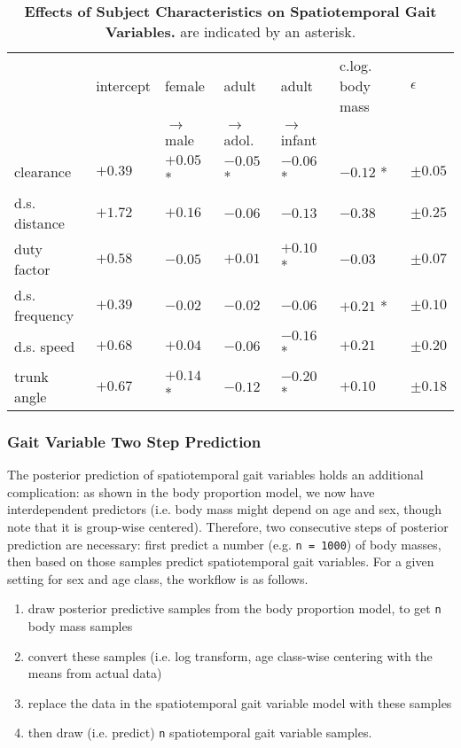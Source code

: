 \begin{table}[p]
\caption{\label{tab:strideresults}\textbf{Effects of Subject Characteristics on Spatiotemporal Gait Variables.}  are indicated by an asterisk.}
\centering
\begin{small}
\begin{tabular}{|l|l|l|l|l|l|l|}
\hline
 & intercept & female  & adult  & adult  & c.log. body mass & \(\epsilon\)\\[0pt]
 &  & \(\rightarrow\) male & \(\rightarrow\) adol. & \(\rightarrow\) infant &  & \\[0pt]
\hline
clearance & \(+0.39\) & \(+0.05\) * & \(-0.05\) * & \(-0.06\) * & \(-0.12\) * & \(\pm 0.05\)\\[0pt]
d.s. distance & \(+1.72\) & \(+0.16\) & \(-0.06\) & \(-0.13\) & \(-0.38\) & \(\pm 0.25\)\\[0pt]
duty factor & \(+0.58\) & \(-0.05\) & \(+0.01\) & \(+0.10\) * & \(-0.03\) & \(\pm 0.07\)\\[0pt]
d.s. frequency & \(+0.39\) & \(-0.02\) & \(-0.02\) & \(-0.06\) & \(+0.21\) * & \(\pm 0.10\)\\[0pt]
d.s. speed & \(+0.68\) & \(+0.04\) & \(-0.06\) & \(-0.16\) * & \(+0.21\) & \(\pm 0.20\)\\[0pt]
trunk angle & \(+0.67\) & \(+0.14\) * & \(-0.12\) & \(-0.20\) * & \(+0.10\) & \(\pm 0.18\)\\[0pt]
\hline
\end{tabular}
\end{small}
\end{table}


\subsubsection{Gait Variable Two Step Prediction}
\label{sec:org3879560}
The posterior prediction of spatiotemporal gait variables holds an additional complication: as shown in the body proportion model, we now have interdependent predictors (i.e. body mass might depend on age and sex, though note that it is group-wise centered).
Therefore, two consecutive steps of posterior prediction are necessary: first predict a number (e.g. \texttt{n = 1000}) of body masses, then based on those samples predict spatiotemporal gait variables.
For a given setting for sex and age class, the workflow is as follows.
\begin{enumerate}
\item draw posterior predictive samples from the body proportion model, to get \texttt{n} body mass samples
\item convert these samples (i.e. log transform, age class-wise centering with the means from actual data)
\item replace the data in the spatiotemporal gait variable model with these samples
\item then draw (i.e. predict) \texttt{n} spatiotemporal gait variable samples.
\end{enumerate}


